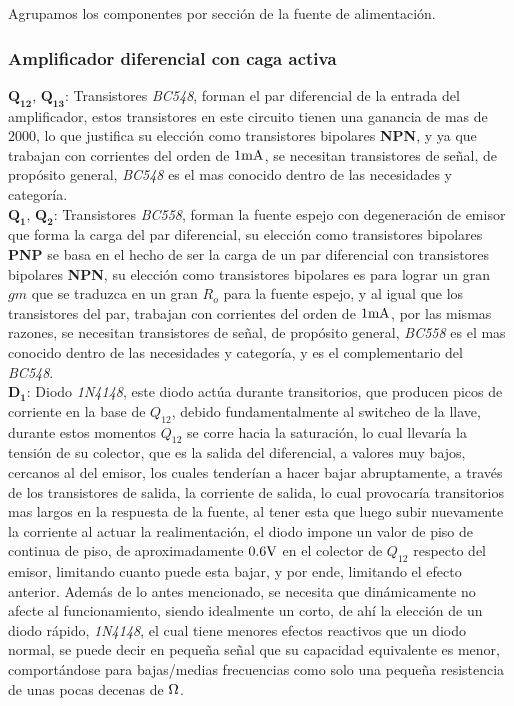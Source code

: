 
\vspace{1.5cm}

Agrupamos los componentes por sección de la fuente de alimentación.

\subsubsection{Amplificador diferencial con caga activa}

$\bm{Q_{12}}$, $\bm{Q_{13}}$: Transistores \textit{BC548}, forman el par diferencial de la entrada del amplificador, estos transistores en este circuito tienen una ganancia de mas de $2000$, lo que justifica su elección como transistores bipolares \textbf{NPN}, y ya que trabajan con corrientes del orden de $1 \si[per-mode=symbol]{\milli\ampere}$, se necesitan transistores de señal, de propósito general, \textit{BC548} es el mas conocido dentro de las necesidades y categoría.\\

$\bm{Q_{1}}$, $\bm{Q_{2}}$: Transistores \textit{BC558}, forman la fuente espejo con degeneración de emisor que forma la carga del par diferencial, su elección como transistores bipolares \textbf{PNP} se basa en el hecho de ser la carga de un par diferencial con transistores bipolares \textbf{NPN}, su elección como transistores bipolares es para lograr un gran $gm$ que se traduzca en un gran $R_{o}$ para la fuente espejo, y al igual que los transistores del par, trabajan con corrientes del orden de $1 \si[per-mode=symbol]{\milli\ampere}$, por las mismas razones, se necesitan transistores de señal, de propósito general, \textit{BC558} es el mas conocido dentro de las necesidades y categoría, y es el complementario del \textit{BC548}.\\

$\bm{D_{1}}$: Diodo \textit{1N4148}, este diodo actúa durante transitorios, que producen picos de corriente en la base de $Q_{12}$, debido fundamentalmente al switcheo de la llave, durante estos momentos $Q_{12}$ se corre hacia la saturación, lo cual llevaría la tensión de su colector, que es la salida del diferencial, a valores muy bajos, cercanos al del emisor, los cuales tenderían a hacer bajar abruptamente, a través de los transistores de salida, la corriente de salida, lo cual provocaría transitorios mas largos en la respuesta de la fuente, al tener esta que luego subir nuevamente la corriente al actuar la realimentación, el diodo impone un valor de piso de continua de piso, de aproximadamente $0.6 \si[per-mode=symbol]{\volt}$ en el colector de $Q_{12}$ respecto del emisor, limitando cuanto puede esta bajar, y por ende, limitando el efecto anterior. Además de lo antes mencionado, se necesita que dinámicamente no afecte al funcionamiento, siendo idealmente un corto, de ahí la elección de un diodo rápido, \textit{1N4148}, el cual tiene menores efectos reactivos que un diodo normal, se puede decir en pequeña señal que su capacidad equivalente es menor, comportándose para bajas/medias frecuencias como solo una pequeña resistencia de unas pocas decenas de $\si[per-mode=symbol]{\ohm}$.\\

